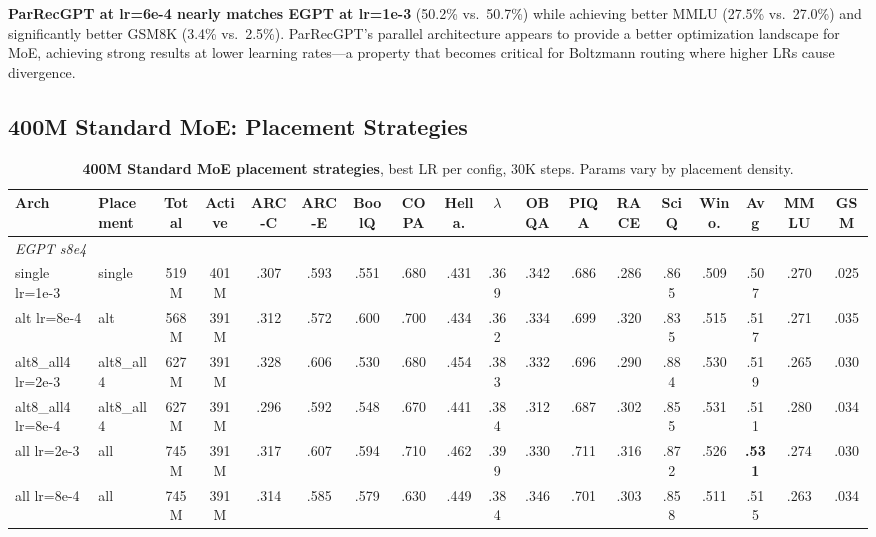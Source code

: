 \documentclass[oneside]{article}
\begin{document}
\textbf{ParRecGPT at lr=6e-4 nearly matches EGPT at lr=1e-3} (50.2\% vs.\ 50.7\%) while achieving better MMLU (27.5\% vs.\ 27.0\%) and significantly better GSM8K (3.4\% vs.\ 2.5\%). ParRecGPT's parallel architecture appears to provide a better optimization landscape for MoE, achieving strong results at lower learning rates---a property that becomes critical for Boltzmann routing where higher LRs cause divergence.


\subsection{400M Standard MoE: Placement Strategies}
\label{sec:moe_placement}

\begin{table}[t]
\centering
\caption{\textbf{400M Standard MoE placement strategies}, best LR per config, 30K steps. Params vary by placement density.}
\label{tab:moe_400m_placement}
\begin{adjustbox}{max width=\textwidth}
\begin{tabular}{l|l|cc|ccccccccccc|c|cc}
\toprule
\textbf{Arch} & \textbf{Placement} & \textbf{Total} & \textbf{Active} & \textbf{ARC-C} & \textbf{ARC-E} & \textbf{BoolQ} & \textbf{COPA} & \textbf{Hella.} & \textbf{$\lambda$} & \textbf{OBQA} & \textbf{PIQA} & \textbf{RACE} & \textbf{SciQ} & \textbf{Wino.} & \textbf{Avg} & \textbf{MMLU} & \textbf{GSM} \\
\midrule
\multicolumn{18}{l}{\textit{EGPT s8e4}} \\
single lr=1e-3      & single    & 519M & 401M & .307 & .593 & .551 & .680 & .431 & .369 & .342 & .686 & .286 & .865 & .509 & .507 & .270 & .025 \\
alt lr=8e-4          & alt       & 568M & 391M & .312 & .572 & .600 & .700 & .434 & .362 & .334 & .699 & .320 & .835 & .515 & .517 & .271 & .035 \\
alt8\_all4 lr=2e-3   & alt8\_all4 & 627M & 391M & .328 & .606 & .530 & .680 & .454 & .383 & .332 & .696 & .290 & .884 & .530 & .519 & .265 & .030 \\
alt8\_all4 lr=8e-4   & alt8\_all4 & 627M & 391M & .296 & .592 & .548 & .670 & .441 & .384 & .312 & .687 & .302 & .855 & .531 & .511 & .280 & .034 \\
all lr=2e-3          & all       & 745M & 391M & .317 & .607 & .594 & .710 & .462 & .399 & .330 & .711 & .316 & .872 & .526 & \textbf{.531} & .274 & .030 \\
all lr=8e-4          & all       & 745M & 391M & .314 & .585 & .579 & .630 & .449 & .384 & .346 & .701 & .303 & .858 & .511 & .515 & .263 & .034 \\

\end{tabular}
\end{adjustbox}
\end{table}
\end{document}
